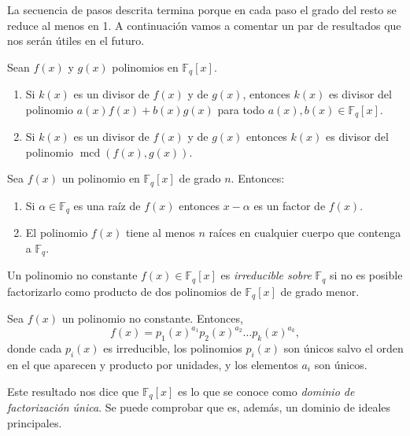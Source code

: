 La secuencia de pasos descrita termina porque en cada paso el grado del resto se reduce al menos en 1.
A continuación vamos a comentar un par de resultados que nos serán útiles en el futuro.

\begin{proposition}
  \label{prop:k-divisor-f-g}
  Sean \(f(x)\) y \(g(x)\) polinomios en \(\mathbb F_q[x]\).
  \begin{enumerate}
    \item Si \(k(x)\) es un divisor de \(f(x)\) y de \(g(x)\), entonces \(k(x)\) es divisor del polinomio \(a(x)f(x) + b(x)g(x)\) para todo \(a(x), b(x) \in \mathbb F_q[x]\).
    \item Si \(k(x)\) es un divisor de \(f(x)\) y de \(g(x)\) entonces \(k(x)\) es divisor del polinomio \(\operatorname{mcd}(f(x), g(x))\).
  \end{enumerate}
\end{proposition}

\begin{proposition}
  \label{prop:raices-factores-pol-Fp}
  Sea \(f(x)\) un polinomio en \(\mathbb F_q[x]\) de grado \(n\). 
  Entonces: 
  \begin{enumerate}
    \item Si \(\alpha \in \mathbb F_q\) es una raíz de \(f(x)\) entonces \(x - \alpha\) es un factor de \(f(x)\).
    \item El polinomio \(f(x)\) tiene al menos \(n\) raíces en cualquier cuerpo que contenga a \(\mathbb F_q\).
  \end{enumerate}
\end{proposition}

Un polinomio no constante \(f(x) \in \mathbb F_q[x]\) es \textit{irreducible sobre} \(\mathbb F_q\) si no es posible factorizarlo como producto de dos polinomios de \(\mathbb F_q[x]\) de grado menor.
\begin{theorem}
  Sea \(f(x)\) un polinomio no constante. Entonces, 
  \[
    f(x) = p_1(x)^{a_1}p_2(x)^{a_2}\dots p_k(x)^{a_k},
  \]
  donde cada \(p_i(x)\) es irreducible, los polinomios \(p_i(x)\) son únicos salvo el orden en el que aparecen y producto por unidades, y los elementos \(a_i\) son únicos.
\end{theorem}
Este resultado nos dice que \(\mathbb F_q[x]\) es lo que se conoce como \textit{dominio de factorización única}.
Se puede comprobar que es, además, un dominio de ideales principales.



